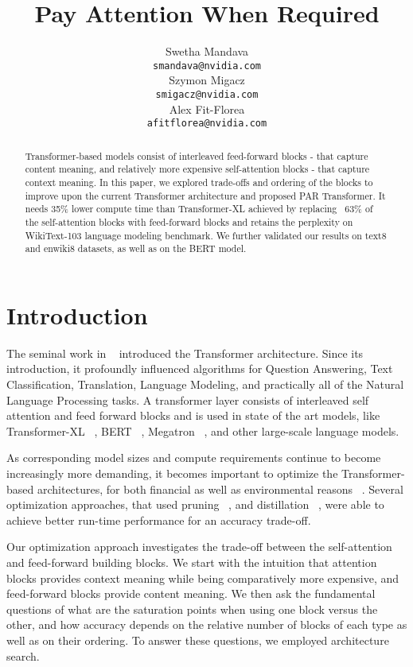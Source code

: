 \documentclass[11pt]{article}
\title{Pay Attention When Required}
\author{
Swetha Mandava \\
  \texttt{smandava@nvidia.com} \\ \And
Szymon Migacz \\
  \texttt{smigacz@nvidia.com} \\ \And
Alex Fit-Florea \\
\texttt{afitflorea@nvidia.com}\\}
\date{}
\begin{document}
\maketitle
\begin{abstract}
Transformer-based models consist of interleaved feed-forward blocks - that capture content meaning, and relatively more expensive self-attention blocks - that capture context meaning. In this paper, we explored trade-offs and ordering of the blocks to improve upon the current Transformer architecture and proposed PAR Transformer. It needs 35\% lower compute time than Transformer-XL achieved by replacing ~63\% of the self-attention blocks with feed-forward blocks and retains the perplexity on WikiText-103 language modeling benchmark. We further validated our results on text8 and enwiki8 datasets, as well as on the BERT model.

\end{abstract}

\section{Introduction}

The seminal work in ~\citep{attention} introduced the Transformer architecture. Since its introduction, it profoundly influenced algorithms for Question Answering, Text Classification, Translation, Language Modeling, and practically all of the Natural Language Processing tasks. A transformer layer consists of interleaved self attention and feed forward blocks and is used in state of the art models, like Transformer-XL ~\citep{TXL}, BERT ~\citep{bert}, Megatron ~\citep{megatron}, and other large-scale language models.

As corresponding model sizes and compute requirements continue to become increasingly more demanding, it becomes important to optimize the Transformer-based architectures, for both financial as well as environmental reasons ~\citep{strubell2019energy}. Several optimization approaches, that used pruning ~\citep{droppingheads}, and distillation ~\citep{distilbert,jiao2020tinybert,wang2020minilm}, were able to achieve better run-time performance for an accuracy trade-off. 

Our optimization approach investigates the trade-off between the self-attention and feed-forward building blocks. We start with the intuition that attention blocks provides context meaning while being comparatively more expensive, and feed-forward blocks provide content meaning. We then ask the fundamental questions of what are the saturation points when using one block versus the other, and how accuracy depends on the relative number of blocks of each type as well as on their ordering. To answer these questions, we employed architecture search. 
\end{document}

